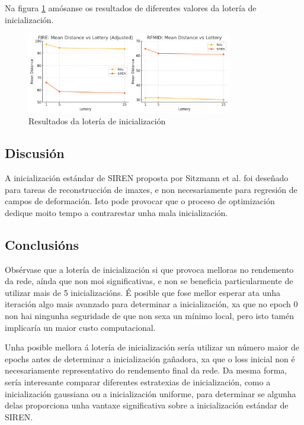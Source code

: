 Na figura \ref{fig:lottery} amósanse os resultados de diferentes valores da lotería de inicialización.


\begin{figure}[tbp]
    \centering
    \includegraphics[width=0.8\textwidth]{imaxes/lottery/lotery.png}
    \caption{Resultados da lotería de inicialización}
    \label{fig:lottery}
\end{figure}


\subsection{Discusión}
\label{subsec:Discusion-initialization}

A inicialización estándar de SIREN proposta por Sitzmann et al. \cite{sitzmann2020implicitneuralrepresentationsperiodic} foi deseñado para tareas de reconstrucción de imaxes, e non necesariamente para regresión de campos de deformación.
Isto pode provocar que o proceso de optimización dedique moito tempo a contrarestar unha mala inicialización. 

\subsection{Conclusións}
\label{subsec:Conclusions-initialization}

Obsérvase que a lotería de inicialización si que provoca melloras no rendemento da rede, aínda que non moi significativas, e non se beneficia particularmente de utilizar mais de 5 inicializacións.
É posible que fose mellor esperar ata unha iteración algo mais avanzado para determinar a inicialización, xa que no epoch 0 non hai ningunha seguridade de que non sexa un mínimo local, pero isto tamén implicaría un maior custo computacional.

Unha posible mellora á lotería de inicialización sería utilizar un número maior de epochs antes de determinar a inicialización gañadora, xa que o loss inicial non é necesariamente representativo do rendemento final da rede.
Da mesma forma, sería interesante comparar diferentes estratexias de inicialización, como a inicialización gaussiana ou a inicialización uniforme, para determinar se algunha delas proporciona unha vantaxe significativa sobre a inicialización estándar de SIREN.

